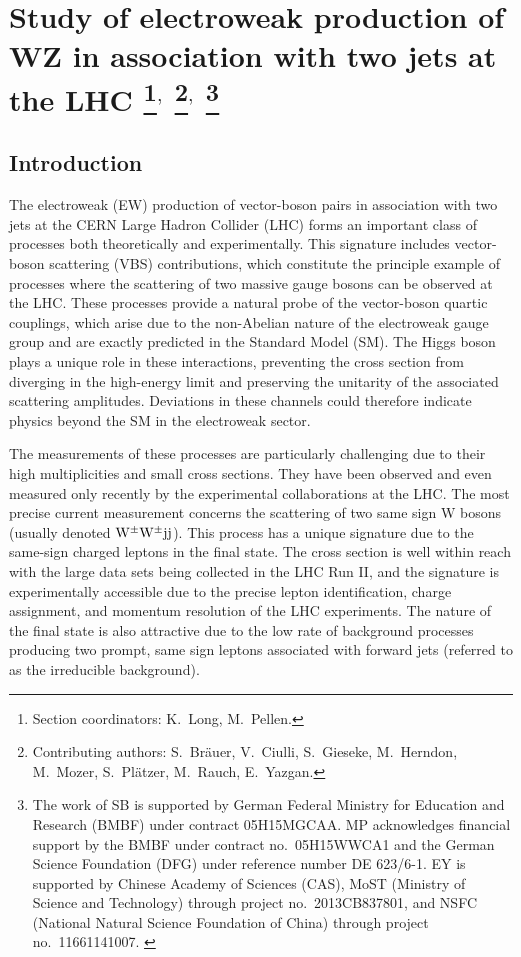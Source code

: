\documentclass[11pt]{cernrep}
\begin{document}
\section{Study of electroweak production of WZ in association with two jets at the LHC 
\protect\footnote{Section coordinators: K.~Long, M.~Pellen.}$^{,}$ 
\protect\footnote{Contributing authors: S.~Br\"auer, V.~Ciulli, S.~Gieseke, M.~Herndon, M.~Mozer, S.~Pl{\"a}tzer, M.~Rauch, E.~Yazgan.}$^{,}$
\protect\footnote{The work of SB is supported by German Federal Ministry for Education and Research (BMBF) under contract 05H15MGCAA.
MP acknowledges financial support by the BMBF under contract no.~05H15WWCA1 and the German Science Foundation (DFG) under reference number DE 623/6-1. 
EY is supported by Chinese Academy of Sciences (CAS), MoST (Ministry of Science and Technology) through project no.~2013CB837801, and NSFC (National Natural Science Foundation of China) through project no.~11661141007. 
\label{vbs_section}}}

\subsection{Introduction \label{vbs_intro}}

The electroweak (EW) production of vector-boson pairs in association with two jets at the CERN Large Hadron Collider (LHC) forms an important class of processes both theoretically and experimentally.
This signature includes vector-boson scattering (VBS) contributions, which constitute the principle example of processes where the scattering of two massive gauge bosons can be observed at the LHC.
These processes provide a natural probe of the vector-boson quartic couplings, which arise due to the non-Abelian nature of the electroweak gauge group and are exactly predicted in the Standard Model (SM).
The Higgs boson plays a unique role in these interactions, preventing the cross section from diverging in the high-energy limit and preserving the unitarity of the associated scattering amplitudes.
Deviations in these channels could therefore indicate physics beyond the SM in the electroweak sector.

The measurements of these processes are particularly challenging due to their high multiplicities and small cross sections.
They have been observed and even measured only recently by the experimental collaborations at the LHC.
The most precise current measurement \cite{Aad:2014zda,Khachatryan:2014sta,Sirunyan:2017ret,Aaboud:2016ffv} concerns the scattering of two same sign W bosons (usually denoted ${\rm W}^\pm{\rm W}^\pm{\rm j}{\rm j}$).
This process has a unique signature due to the same-sign charged leptons in the final state.
The cross section is well within reach with the large data sets being collected in the LHC Run II, and the
signature is experimentally accessible due to the precise lepton identification, charge assignment, and momentum resolution of the LHC experiments.
The nature of the final state is also attractive due to the low rate of background processes
producing two prompt, same sign leptons associated with forward jets (referred to as the irreducible background).
\end{document}

